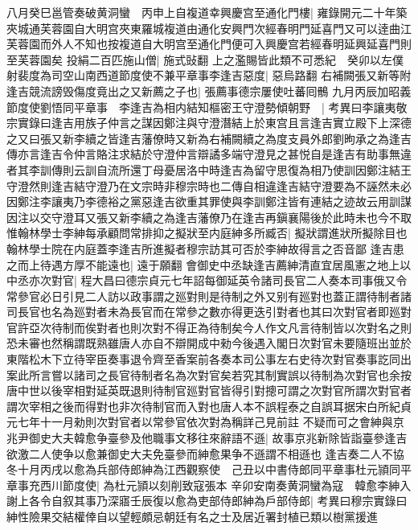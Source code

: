八月癸巳邕管奏破黄洞蠻　丙申上自複道幸興慶宫至通化門樓|{
	雍錄開元二十年築夾城通芙蓉園自大明宫夾東羅城複道由通化安興門次經春明門延喜門又可以逹曲江芙蓉園而外人不知也按複道自大明宫至通化門便可入興慶宫若經春明延興延喜門則至芙蓉園矣}
投絹二百匹施山僧|{
	施式䜴翻}
上之濫賜皆此類不可悉紀　癸卯以左僕射裴度為司空山南西道節度使不兼平章事李逢吉惡度|{
	惡烏路翻}
右補闕張又新等附逢吉競流謗毁傷度竟出之又新薦之子也|{
	張薦事德宗屢使吐蕃囘鶻}
九月丙辰加昭義節度使劉悟同平章事　李逢吉為相内結知樞密王守澄勢傾朝野　|{
	考異曰李讓夷敬宗實錄曰逢吉用族子仲言之謀因鄭注與守澄潛結上於東宫且言逢吉實立殿下上深德之又曰張又新李續之皆逢吉藩僚時又新為右補闕續之為度支員外郎劉昫承之為逢吉傳亦言逢吉令仲言賂注求結於守澄仲言辯譎多端守澄見之甚悦自是逢吉有助事無違者其李訓傳則云訓自流所還丁母憂居洛中時逢吉為留守思復為相乃使訓因鄭注結王守澄然則逢吉結守澄乃在文宗時非穆宗時也二傳自相違逢吉結守澄要為不誣然未必因鄭注李讓夷乃李德裕之黨惡逢吉欲重其罪使與李訓鄭注皆有連結之迹故云用訓謀因注以交守澄耳又張又新李續之為逢吉藩僚乃在逢吉再鎭襄陽後於此時未也今不取}
惟翰林學士李紳每承顧問常排抑之擬狀至内庭紳多所臧否|{
	擬狀謂進狀所擬除目也翰林學士院在内庭蓋李逢吉所進擬者穆宗訪其可否於李紳故得言之否音鄙}
逢吉患之而上待遇方厚不能遠也|{
	遠于願翻}
會御史中丞缺逢吉薦紳清直宜居風憲之地上以中丞亦次對官|{
	程大昌曰德宗貞元七年詔每御延英令諸司長官二人奏本司事俄又令常參官必日引見二人訪以政事謂之廵對則是待制之外又别有廵對也蓋正謂待制者諸司長官也名為廵對者未為長官而在常參之數亦得更迭引對者也其曰次對官者即廵對官許亞次待制而俟對者也則次對不得正為待制矣今人作文凡言待制皆以次對名之則恐未審也然稱謂既熟雖唐人亦自不辯開成中勑今後遇入閣日次對官未要隨班出並於東階松木下立待宰臣奏事退令齊至香案前各奏本司公事左右史待次對官奏事訖同出案此所言嘗以諸司之長官待制者名為次對官矣若究其制實誤以待制為次對官也余按唐中世以後宰相對延英既退則待制官廵對官皆得引對摠可謂之次對官所謂次對官者謂次宰相之後而得對也非次待制官而入對也唐人本不誤程泰之自誤耳据宋白所紀貞元七年十一月勑則次對官者以常參官依次對為稱詳己見前註}
不疑而可之會紳與京兆尹御史大夫韓愈争臺參及他職事文移往來辭語不遜|{
	故事京兆新除皆詣臺參逢吉欲激二人使争以愈兼御史大夫免臺參而紳愈果争不遜謂不相遜也}
逢吉奏二人不協冬十月丙戌以愈為兵部侍郎紳為江西觀察使　己丑以中書侍郎同平章事杜元頴同平章事充西川節度使|{
	為杜元頴以刻削致寇張本}
辛卯安南奏黄洞蠻為寇　韓愈李紳入謝上各令自叙其事乃深寤壬辰復以愈為吏部侍郎紳為戶部侍郎|{
	考異曰穆宗實錄曰紳性險果交結權倖自以望輕頗忌朝廷有名之士及居近署封植已類以樹黨援進}


